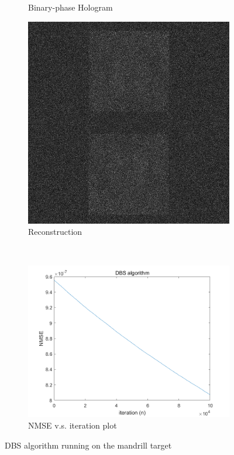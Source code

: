 \begin{figure}[H]
\begin{subfigure}[t]{0.3\textwidth}
    \caption{Binary-phase Hologram}
    \label{fig:DBS_mandrill_2_Holo}
  \end{subfigure}
  \hfill
  \begin{subfigure}[t]{0.3\textwidth}
    \centering
    \includegraphics[width=\textwidth]{DBS_mandrill_2_recon_intensity.jpg}
    \caption{Reconstruction}
    \label{fig:DBS_mandrill_2_recon_intensity}
  \end{subfigure}
  \\
  \begin{subfigure}[t]{0.7\textwidth}
    \centering
    \includegraphics[width=\textwidth]{DBS_mandrill_2_convergence.png}
    \caption{NMSE v.s. iteration plot}
    \label{fig:DBS_mandrill_2_convergence}
  \end{subfigure}
  \caption{DBS algorithm running on the mandrill target}
  \label{fig:DBS algorithm running on the mandrill target}
\end{figure}

